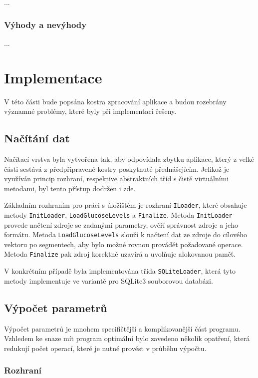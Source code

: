 \documentclass[]{thesiskiv}
\begin{document}
...

\subsection*{Výhody a nevýhody}

...



\chapter{Implementace}

V této části bude popsána kostra zpracování aplikace a budou rozebrány významné problémy, které byly při implementaci řešeny.

\section{Načítání dat}

Načítací vrstva byla vytvořena tak, aby odpovídala zbytku aplikace, který z velké části sestává z předpřipravené kostry poskytnuté přednášejícím. Jelikož je využíván princip rozhraní, respektive abstraktních tříd s čistě virtuálními metodami, byl tento přístup dodržen i zde.

Základním rozhraním pro práci s úložištěm je rozhraní \texttt{ILoader}, které obsahuje metody \texttt{InitLoader}, \texttt{LoadGlucoseLevels} a \texttt{Finalize}. Metoda \texttt{InitLoader} provede načtení zdroje se zadanými parametry, ověří správnost zdroje a jeho formátu. Metoda \texttt{LoadGlucoseLevels} slouží k načtení dat ze zdroje do cílového vektoru po segmentech, aby bylo možné rovnou provádět požadované operace. Metoda \texttt{Finalize} pak zdroj korektně uzavírá a uvolňuje alokovanou paměť.

V konkrétním případě byla implementována třída \texttt{SQLiteLoader}, která tyto metody implementuje ve variantě pro SQLite3 souborovou databázi.

\section{Výpočet parametrů}

Výpočet parametrů je mnohem specifičtější a komplikovanější část programu. Vzhledem ke snaze mít program optimální bylo zavedeno několik opatření, která redukují počet operací, které je nutné provést v průběhu výpočtu.

\subsection{Rozhraní}
\end{document}
